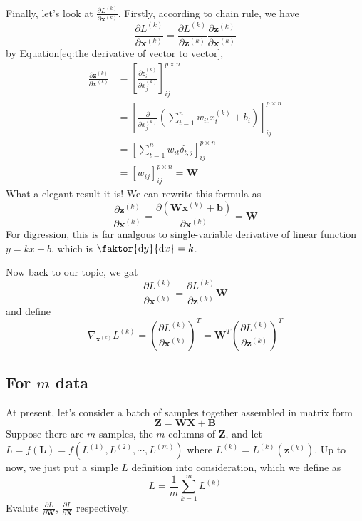 \documentclass{article}
\newcommand{\Derivative}[2]{\ensuremath{\frac{\partial#1}{\partial#2}}}
\begin{document}
Finally, let's look at  $\Derivative{L^{(k)}}{\boldsymbol{x}^{(k)}}$. Firstly, according to chain rule, we have
\begin{equation}
    \Derivative{L^{(k)}}{\boldsymbol{x}^{(k)}}=\Derivative{L^{(k)}}{\boldsymbol{z}^{(k)}}\Derivative{\boldsymbol{z}^{(k)}}{\boldsymbol{x}^{(k)}}
\end{equation}
by {\sc Equation}\eqref{eq:the derivative of vector to vector},
\begin{equation}
    \begin{split}
        \Derivative{\boldsymbol{z}^{(k)}}{\boldsymbol{x}^{(k)}}
        &=\left[\Derivative{z^{(k)}_i}{x^{(k)}_j}\right]^{p\times n}_{ij}\\
        &=\left[
            \Derivative{}{x^{(k)}_j}\left(
                \sum_{t=1}^n w_{it}x^{(k)}_t+b_i
            \right)
        \right]^{p\times n}_{ij}\\
        &=\left[
            \sum_{t=1}^n w_{it}\delta_{t,j}
        \right]^{p\times n}_{ij}\\
        &=\left[
            w_{ij}
        \right]^{p\times n}_{ij}
        =\boldsymbol{W}
    \end{split}
\end{equation}
What a elegant result it is! We can rewrite this formula as
\begin{equation}
    \Derivative{\boldsymbol{z}^{(k)}}{\boldsymbol{x}^{(k)}}=
    \Derivative{\left(\boldsymbol{W}\boldsymbol{x}^{(k)}+\boldsymbol{b}\right)}{\boldsymbol{x}^{(k)}}=\boldsymbol{W}
\end{equation}
For digression, this is far analgous to single-variable derivative of linear function $y=kx+b$, which is $\faktor{\mathrm{d}y}{\mathrm{d}x}=k$.

Now back to our topic, we gat
\begin{equation}
    \Derivative{L^{(k)}}{\boldsymbol{x}^{(k)}}=\Derivative{L^{(k)}}{\boldsymbol{z}^{(k)}}\boldsymbol{W}
\end{equation}
and define 
\begin{equation}
    \nabla_{\boldsymbol{x}^(k)}L^{(k)}=\left(
        \Derivative{L^{(k)}}{\boldsymbol{x}^{(k)}}
    \right)^T=\boldsymbol{W}^T\left(\Derivative{L^{(k)}}{\boldsymbol{z}^{(k)}}\right)^T
\end{equation}

\subsection{For $m$ data}
At present, let's consider a batch of samples together assembled in matrix form
\begin{equation}
    \boldsymbol{Z}=\boldsymbol{W}\boldsymbol{X}+\boldsymbol{B}
\end{equation}
Suppose there are $m$ samples, the $m$ columns of $\boldsymbol{Z}$, and let $L=f(\boldsymbol{L})=f(L^{(1)},L^{(2)},\cdots,L^{(m)})$ where $L^{(k)}=L^{(k)}(\boldsymbol{z}^{(k)})$. Up to now, we just put a simple $L$ definition into consideration, which we define as\begin{equation}
    L=\frac{1}{m}\sum^{m}_{k=1}L^{(k)}
\end{equation}
Evalute $\Derivative{L}{\boldsymbol{W}}$, $\Derivative{L}{\boldsymbol{X}}$ respectively.
\end{document}
